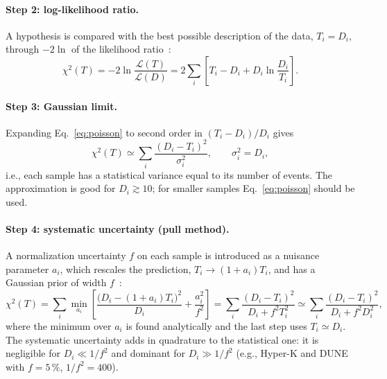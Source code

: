 \documentclass[11pt,a4paper]{article}
\begin{document}
\paragraph{Step 2: log-likelihood ratio.}
A hypothesis is compared with the best possible description of the data, $T_i = D_i$, through
$-2\ln$ of the likelihood ratio~\cite{ParticleDataGroup:2024cfk}:
\begin{equation}
  \chi^2(T) = -2\ln\frac{\mathcal L(T)}{\mathcal L(D)}
  = 2\sum_i \left[T_i - D_i + D_i\ln\frac{D_i}{T_i}\right] .
  \label{eq:poisson}
\end{equation}

\paragraph{Step 3: Gaussian limit.}
Expanding Eq.~\eqref{eq:poisson} to second order in $(T_i-D_i)/D_i$ gives
\begin{equation}
  \chi^2(T) \simeq \sum_i \frac{(D_i - T_i)^2}{\sigma_i^2},\qquad \sigma_i^2 = D_i ,
  \label{eq:gauss}
\end{equation}
i.e., each sample has a statistical variance equal to its number of events. The approximation is good for
$D_i\gtrsim 10$; for smaller samples Eq.~\eqref{eq:poisson} should be used.

\paragraph{Step 4: systematic uncertainty (pull method).}
A normalization uncertainty $f$ on each sample is introduced as a nuisance parameter $a_i$, which rescales
the prediction, $T_i\to(1+a_i)T_i$, and has a Gaussian prior of width $f$~\cite{Fogli:2002pt}:
\begin{equation}
  \chi^2(T) = \sum_i \min_{a_i}\left[\frac{\big(D_i - (1+a_i)T_i\big)^2}{D_i} + \frac{a_i^2}{f^2}\right]
  = \sum_i \frac{(D_i - T_i)^2}{D_i + f^2 T_i^2}
  \simeq \sum_i \frac{(D_i - T_i)^2}{D_i + f^2 D_i^2} ,
  \label{eq:pull}
\end{equation}
where the minimum over $a_i$ is found analytically and the last step uses $T_i\simeq D_i$. The systematic
uncertainty adds in quadrature to the statistical one: it is negligible for $D_i\ll 1/f^2$ and dominant for
$D_i\gg 1/f^2$ (e.g., Hyper-K and DUNE with $f=5\,\%$, $1/f^2=400$).
\end{document}
